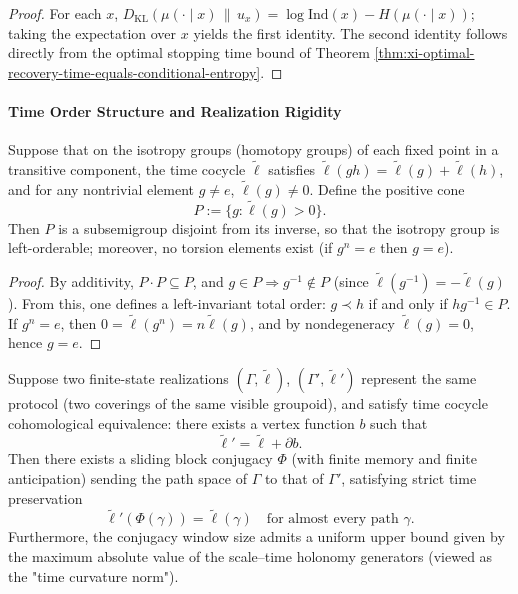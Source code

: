 \begin{proof}
For each \(x\),
\(
D_{\mathrm{KL}}(\mu(\cdot\mid x)\,\|\,u_x)=\log\mathrm{Ind}(x)-H(\mu(\cdot\mid x))
\);
taking the expectation over \(x\) yields the first identity.
The second identity follows directly from the optimal stopping time bound of Theorem \ref{thm:xi-optimal-recovery-time-equals-conditional-entropy}.
\end{proof}

\paragraph{Time Order Structure and Realization Rigidity}

\begin{proposition}\label{prop:xi-time-positive-cocycle-left-order-torsionfree}
Suppose that on the isotropy groups (homotopy groups) of each fixed point in a transitive component, the time cocycle \(\widetilde{\ell}\) satisfies
\(\widetilde{\ell}(gh)=\widetilde{\ell}(g)+\widetilde{\ell}(h)\),
and for any nontrivial element \(g\neq e\), \(\widetilde{\ell}(g)\neq 0\).
Define the positive cone
\[
P:=\{g:\widetilde{\ell}(g)>0\}.
\]
Then \(P\) is a subsemigroup disjoint from its inverse, so that the isotropy group is left-orderable; moreover, no torsion elements exist (if \(g^n=e\) then \(g=e\)).
\end{proposition}

\begin{proof}
By additivity, \(P\cdot P\subseteq P\), and \(g\in P\Rightarrow g^{-1}\notin P\) (since \(\widetilde{\ell}(g^{-1})=-\widetilde{\ell}(g)\)).
From this, one defines a left-invariant total order: \(g\prec h\) if and only if \(h g^{-1}\in P\).
If \(g^n=e\), then \(0=\widetilde{\ell}(g^n)=n\widetilde{\ell}(g)\), and by nondegeneracy \(\widetilde{\ell}(g)=0\), hence \(g=e\).
\end{proof}

\begin{theorem}\label{thm:xi-time-conjugacy-rigidity-bounded-class}
Suppose two finite-state realizations \((\Gamma,\widetilde{\ell})\), \((\Gamma',\widetilde{\ell}')\) represent the same protocol (two coverings of the same visible groupoid), and satisfy time cocycle cohomological equivalence: there exists a vertex function \(b\) such that
\[
\widetilde{\ell}'=\widetilde{\ell}+\partial b.
\]
Then there exists a sliding block conjugacy \(\Phi\) (with finite memory and finite anticipation) sending the path space of \(\Gamma\) to that of \(\Gamma'\), satisfying strict time preservation
\[
\widetilde{\ell}'(\Phi(\gamma))=\widetilde{\ell}(\gamma)
\quad\text{for almost every path \(\gamma\)}.
\]
Furthermore, the conjugacy window size admits a uniform upper bound given by the maximum absolute value of the scale--time holonomy generators (viewed as the "time curvature norm").
\end{theorem}

